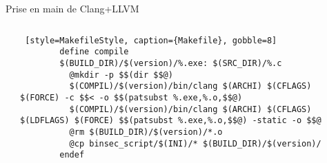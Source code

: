 \documentclass[A4,svgnames,9pt,aspectratio=169]{beamer}
\begin{document}

\begin{frame}[fragile]{Prise en main de Clang+LLVM}
  \begin{columns}
    \begin{column}{0.4\textwidth}
      \tiny{
      }
    \end{column}
    \begin{column}{0.6\textwidth}
      \begin{lstlisting} [style=MakefileStyle, caption={Makefile}, gobble=8]
        define compile
        $(BUILD_DIR)/$(version)/%.exe: $(SRC_DIR)/%.c
          @mkdir -p $$(dir $$@)
          $(COMPIL)/$(version)/bin/clang $(ARCHI) $(CFLAGS) $(FORCE) -c $$< -o $$(patsubst %.exe,%.o,$$@)
          $(COMPIL)/$(version)/bin/clang $(ARCHI) $(CFLAGS) $(LDFLAGS) $(FORCE) $$(patsubst %.exe,%.o,$$@) -static -o $$@
          @rm $(BUILD_DIR)/$(version)/*.o
          @cp binsec_script/$(INI)/* $(BUILD_DIR)/$(version)/
        endef
      \end{lstlisting}
    \end{column}
  \end{columns}

\end{frame}

\end{document}

